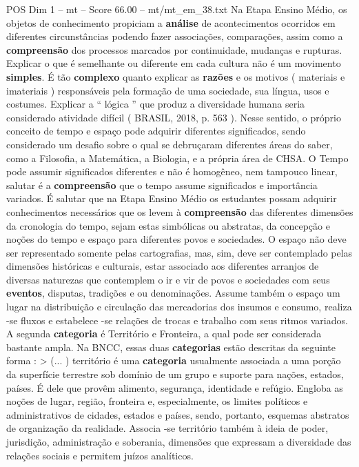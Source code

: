 \begin{textsample}{POS Dim 1 – mt – Score 66.00 – mt/mt\_em\_38.txt}
Na Etapa Ensino Médio, os objetos de conhecimento propiciam a \textbf{análise} de acontecimentos ocorridos em diferentes circunstâncias podendo fazer associações, comparações, assim como a \textbf{compreensão} dos processos marcados por continuidade, mudanças e rupturas.
Explicar o que é semelhante ou diferente em cada cultura não é um movimento \textbf{simples}.
É tão \textbf{complexo} quanto explicar as \textbf{razões} e os motivos ( materiais e imateriais ) responsáveis pela formação de uma sociedade, sua língua, usos e costumes.
Explicar a “ lógica ” que produz a diversidade humana seria considerado atividade difícil ( BRASIL, 2018, p. 563 ).
Nesse sentido, o próprio conceito de tempo e espaço pode adquirir diferentes significados, sendo considerado um desafio sobre o qual se debruçaram diferentes áreas do saber, como a Filosofia, a Matemática, a Biologia, e a própria área de CHSA.
O Tempo pode assumir significados diferentes e não é homogêneo, nem tampouco linear, salutar é a \textbf{compreensão} que o tempo assume significados e importância variados.
É salutar que na Etapa Ensino Médio os estudantes possam adquirir conhecimentos necessários que os levem à \textbf{compreensão} das diferentes dimensões da cronologia do tempo, sejam estas simbólicas ou abstratas, da concepção e noções do tempo e espaço para diferentes povos e sociedades.
O espaço não deve ser representado somente pelas cartografias, mas, sim, deve ser contemplado pelas dimensões históricas e culturais, estar associado aos diferentes arranjos de diversas naturezas que contemplem o ir e vir de povos e sociedades com seus \textbf{eventos}, disputas, tradições e ou denominações.
Assume também o espaço um lugar na distribuição e circulação das mercadorias dos insumos e consumo, realiza -se fluxos e estabelece -se relações de trocas e trabalho com seus ritmos variados.
A segunda \textbf{categoria} é Território e Fronteira, a qual pode ser considerada bastante ampla.
Na BNCC, essas duas \textbf{categorias} estão descritas da seguinte forma : > (... ) território é uma \textbf{categoria} usualmente associada a uma porção da superfície terrestre sob domínio de um grupo e suporte para nações, estados, países.
É dele que provêm alimento, segurança, identidade e refúgio.
Engloba as noções de lugar, região, fronteira e, especialmente, os limites políticos e administrativos de cidades, estados e países, sendo, portanto, esquemas abstratos de organização da realidade.
Associa -se território também à ideia de poder, jurisdição, administração e soberania, dimensões que expressam a diversidade das relações sociais e permitem juízos analíticos.

\end{textsample}
